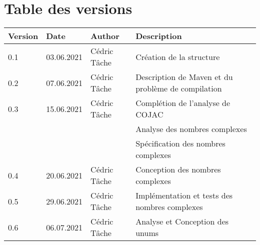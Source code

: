 \documentclass[french,11pt]{report}
\begin{document}



\section *{Table des versions}
\vspace*{0.5 cm}

\begin{table}[h]
    \begin{tabularx}{\columnwidth}{ | p{3.5em} |p{7em} | p{6.5em} | X |}
        \hline
        \textbf{Version} & \textbf{Date} & \textbf{Author} & \textbf{Description} \\
        \hline
        0.1 & 03.06.2021 & Cédric Tâche & Création de la structure \\
        0.2 & 07.06.2021 & Cédric Tâche & Description de Maven et du problème de compilation \\
        0.3 & 15.06.2021 & Cédric Tâche & Complétion de l'analyse de COJAC \\
         & & & Analyse des nombres complexes \\
         & & & Spécification des nombres complexes \\
        0.4 & 20.06.2021 & Cédric Tâche & Conception des nombres complexes \\
        0.5 & 29.06.2021 & Cédric Tâche & Implémentation et tests des nombres complexes \\
        0.6 & 06.07.2021 & Cédric Tâche & Analyse et Conception des unums \\
        \hline
    \end{tabularx}
\end{table}

\newpage


\hypersetup{
	hidelinks,
	allcolors=black,
	linktocpage,
	linktoc=all
}
\tableofcontents
\newpage




\end{document}
